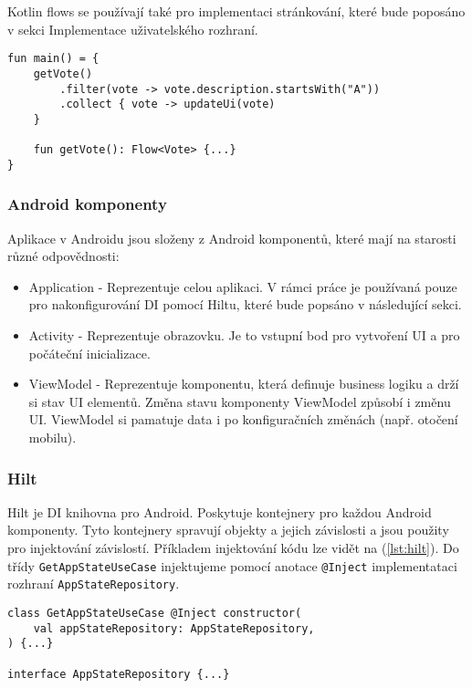 Kotlin flows se používají také pro implementaci stránkování, které bude poposáno v sekci Implementace uživatelského rozhraní.

\begin{lstlisting}[caption={Příklad intermediate operátoru pro flow}, label={lst:flow-intermediate}, tabsize=2]
fun main() = {
	getVote()
		.filter(vote -> vote.description.startsWith("A"))
		.collect { vote -> updateUi(vote)
	}

	fun getVote(): Flow<Vote> {...}
}
\end{lstlisting}

\subsubsection *{Android komponenty}
Aplikace v Androidu jsou složeny z Android komponentů, které mají na starosti různé odpovědnosti:

\begin{itemize}
	\item Application - Reprezentuje celou aplikaci. V rámci práce je používaná pouze pro nakonfigurování DI pomocí Hiltu, které bude popsáno v následující sekci.
	\item Activity - Reprezentuje obrazovku. Je to vstupní bod pro vytvoření UI a pro počáteční inicializace.
	\item ViewModel - Reprezentuje komponentu, která definuje business logiku a drží si stav UI elementů. Změna stavu komponenty ViewModel způsobí i změnu UI. ViewModel si pamatuje data i po konfiguračních změnách (např. otočení mobilu).
\end{itemize}

\subsubsection *{Hilt}
Hilt je DI knihovna pro Android. Poskytuje kontejnery pro každou Android komponenty. Tyto kontejnery spravují objekty a jejich závislosti a jsou použity pro injektování závislostí. Příkladem injektování kódu lze vidět na (\ref{lst:hilt}). Do třídy \lstinline|GetAppStateUseCase| injektujeme pomocí anotace \lstinline|@Inject| implementataci rozhraní \lstinline|AppStateRepository|.

\begin{lstlisting}[caption={Příklad použití DI pomocí knihovny Hilt}, label={lst:hilt}, tabsize=2]
class GetAppStateUseCase @Inject constructor(
	val appStateRepository: AppStateRepository,
) {...}

interface AppStateRepository {...}
\end{lstlisting}

